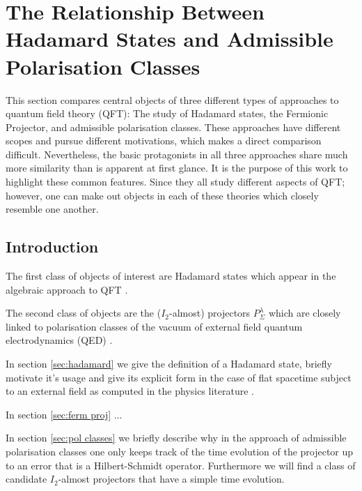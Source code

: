 \documentclass[b5paper,draft,openbib,12pt]{memoir}
\begin{document}
\section{The Relationship Between Hadamard States and Admissible Polarisation Classes}\label{sec: hadamard}



This section compares central objects of three different types of approaches to quantum field theory (QFT): The study of Hadamard states, the
Fermionic Projector, and admissible polarisation classes.
These approaches have different scopes and pursue different motivations, which makes a direct comparison difficult.
Nevertheless, the basic protagonists in all three approaches share much more similarity than is apparent at first glance.
It is the purpose of this work to highlight these common features. 
Since they all study different aspects of QFT; however, one can make out objects in each of these theories which closely resemble
one another. 

\subsection{Introduction}


The first class of objects of interest are Hadamard states which appear in the algebraic approach to 
QFT \cite{fulling1978singularity}. 


The second class of objects are the (\(I_2\)-almost) projectors \(P^\lambda_{\Sigma}\) which are 
closely linked to polarisation classes of the vacuum of external field quantum electrodynamics (QED) \cite{ivp0, ivp1, ivp2}. 


In section \ref{sec:hadamard} we give the definition of a Hadamard state, briefly motivate it's usage 
and give its explicit form in the case of flat spacetime subject to an external field as computed in the physics literature \cite{schlemmer2015current}.

In section \ref{sec:ferm proj} ...

In section \ref{sec:pol classes} we briefly describe why in the approach of admissible polarisation classes one only keeps track of the time
evolution of the projector up to an error that is a Hilbert-Schmidt operator. Furthermore we will find a class of candidate \(I_2\)-almost projectors
that have a simple time evolution.
\end{document}

